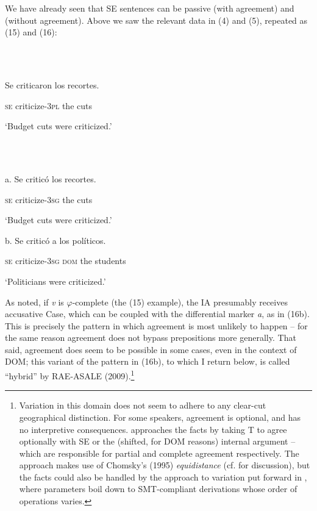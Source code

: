 \documentclass[output=paper]{langsci/langscibook}
\begin{document}
We have already seen that SE sentences can be passive (with agreement) and  (without agreement). Above we saw the relevant data in (4) and (5), repeated as (15) and (16):

\ea%
    \label{ex:key:15}
    \gll\\
        \\
    \glt
    \z


Se  criticaron        los recortes.            

  \textsc{se} criticize\textsc{{}-3pl}  the cuts

            ‘Budget cuts were criticized.’

\ea%
    \label{ex:key:16}
    \gll\\
        \\
    \glt
    \z


a.   Se   criticó             los  recortes.            

        \textsc{se} criticize\textsc{{}-3sg}  the  cuts

                 ‘Budget cuts were criticized.’

  b.   Se  criticó             a        los  políticos.             

      \textsc{se} criticize\textsc{{}-3sg  dom} the students

      ‘Politicians were criticized.’

As noted, if \textit{v} is $\varphi $-complete (the (15) example), the IA presumably receives accusative Case, which can be coupled with the differential marker \textit{a}, as in (16b). This is precisely the pattern in which agreement is most unlikely to happen – for the same reason agreement does not bypass prepositions more generally. That said, agreement does seem to be possible in some cases, even in the context of DOM; this variant of the pattern in (16b), to which I return below, is called “hybrid” by RAE-ASALE (2009).\footnote{Variation in this domain does not seem to adhere to any clear-cut geographical distinction. For some speakers, agreement is optional, and has no interpretive consequences. \citet{Planells2017} approaches the facts by taking T to agree optionally with SE or the (shifted, for DOM reasons) internal argument – which are responsible for partial and complete agreement respectively. The approach makes use of Chomsky’s (1995) \textit{equidistance} (cf. \citealt{Gallego2013} for discussion), but the facts could also be handled by the approach to variation put forward in \citet{Obata2016}, where parameters boil down to SMT-compliant derivations whose order of operations varies.}
\end{document}
